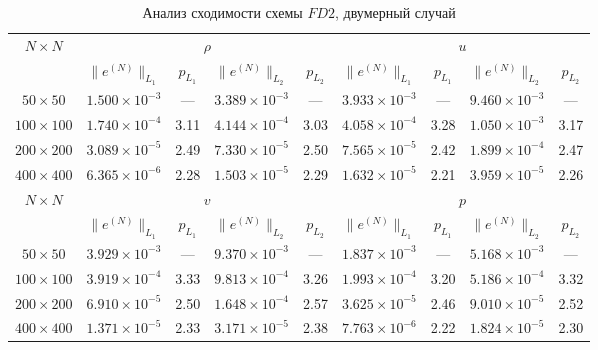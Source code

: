 \documentclass[a4paper,14pt]{extarticle}
\theoremstyle{theorem}
\theoremstyle{lemma}
\begin{document}

\begin{table}[H]
\centering
\fontsize{13pt}{15.6pt}\selectfont
\setlength{\tabcolsep}{4pt}
\caption{Анализ сходимости схемы $FD2$, двумерный случай}
\vspace{0.1cm}
\label{tab:conv_fd2_2d}
\begin{tabular}{c|cccc|cccc}
\toprule
\multirow{2}{*}{$N \times N$}
  & \multicolumn{4}{c}{$\rho$}
  & \multicolumn{4}{c}{$u$} \\
\cmidrule(lr){2-5}\cmidrule(lr){6-9}
  & $\|e^{(N)}\|_{L_1}$ & $p_{L_1}$
  & $\|e^{(N)}\|_{L_2}$ & $p_{L_2}$
  & $\|e^{(N)}\|_{L_1}$ & $p_{L_1}$
  & $\|e^{(N)}\|_{L_2}$ & $p_{L_2}$ \\
\midrule
$50{\times}50$  & $1.500\times10^{-3}$ & --- & $3.389\times10^{-3}$ & --- & $3.933\times10^{-3}$ & --- & $9.460\times10^{-3}$ & --- \\
$100{\times}100$ & $1.740\times10^{-4}$ & 3.11 & $4.144\times10^{-4}$ & 3.03 & $4.058\times10^{-4}$ & 3.28 & $1.050\times10^{-3}$ & 3.17 \\
$200{\times}200$ & $3.089\times10^{-5}$ & 2.49 & $7.330\times10^{-5}$ & 2.50 & $7.565\times10^{-5}$ & 2.42 & $1.899\times10^{-4}$ & 2.47 \\
$400{\times}400$ & $6.365\times10^{-6}$ & 2.28 & $1.503\times10^{-5}$ & 2.29 & $1.632\times10^{-5}$ & 2.21 & $3.959\times10^{-5}$ & 2.26 \\
\midrule
\multirow{2}{*}{$N \times N$}
  & \multicolumn{4}{c}{$v$}
  & \multicolumn{4}{c}{$p$} \\
\cmidrule(lr){2-5}\cmidrule(lr){6-9}
  & $\|e^{(N)}\|_{L_1}$ & $p_{L_1}$
  & $\|e^{(N)}\|_{L_2}$ & $p_{L_2}$
  & $\|e^{(N)}\|_{L_1}$ & $p_{L_1}$
  & $\|e^{(N)}\|_{L_2}$ & $p_{L_2}$ \\
\midrule
$50{\times}50$  & $3.929\times10^{-3}$ & --- & $9.370\times10^{-3}$ & --- & $1.837\times10^{-3}$ & --- & $5.168\times10^{-3}$ & --- \\
$100{\times}100$ & $3.919\times10^{-4}$ & 3.33 & $9.813\times10^{-4}$ & 3.26 & $1.993\times10^{-4}$ & 3.20 & $5.186\times10^{-4}$ & 3.32 \\
$200{\times}200$ & $6.910\times10^{-5}$ & 2.50 & $1.648\times10^{-4}$ & 2.57 & $3.625\times10^{-5}$ & 2.46 & $9.010\times10^{-5}$ & 2.52 \\
$400{\times}400$ & $1.371\times10^{-5}$ & 2.33 & $3.171\times10^{-5}$ & 2.38 & $7.763\times10^{-6}$ & 2.22 & $1.824\times10^{-5}$ & 2.30 \\
\bottomrule
\end{tabular}
\end{table}
\end{document}
